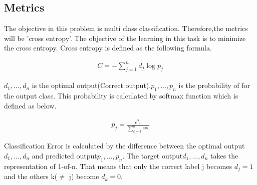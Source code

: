 \subsection{Metrics}


The objective in this problem is multi class classification. Therefore,the metrics will be 'cross entropy'. The objective of the learning in this task is to minimize the cross entropy.
Cross entropy is defined as the following formula\cite{Deep Learning}.


\begin{eqnarray}
C = -\sum_{j=1}^{n}d_{j}\log p_{j}
\end{eqnarray}

$d_{1},...,d_{n}$ is the optimal output(Correct output).$p_{1},...,p_{n}$ is the  probability of for the output class. This probability is calculated by softmax function which is defined as below.

\begin{eqnarray}
p_{j}=\frac{e^{u_{j}}}{\sum_{k=1}^{n}e^{u_{k}}}
\end{eqnarray}

Classification Error is calculated by the difference between the optimal output $d_{1},...,d_{n}$ and predicted output$p_{1},...,p_{n}$.
The target output$d_{1},...,d_{n}$ takes the representation of 1-of-n. That means that only the correct label j becomes $d_{j}=1$ and the others k($\neq$ j) become $d_{k}=0$.